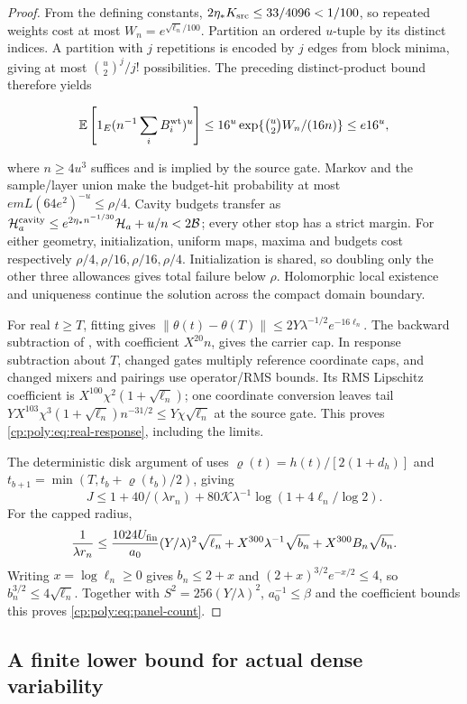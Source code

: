 \begin{proof}
From the defining constants,
$2\eta_*K_{\rm src}\le33/4096<1/100$, so repeated weights cost at most
$W_n=e^{\sqrt{\ell_n}/100}$. Partition an ordered $u$-tuple by its
distinct indices. A partition with $j$ repetitions is encoded by $j$
edges from block minima, giving at most $\binom u2^j/j!$ possibilities.
The preceding distinct-product bound therefore yields

\[
\mathbb E\left[1_E(n^{-1}\sum_iB_i^{\rm wt})^u\right]
 \le16^u\exp\{\tbinom u2W_n/(16n)\}\le e16^u,
\]

where $n\ge4u^3$ suffices and is implied by the source gate.
Markov and the sample/layer union make the budget-hit probability at most
$emL(64e^2)^{-u}\le\rho/4$.
Cavity budgets transfer as
$\mathcal H_a^{\rm cavity}\le
e^{2\eta_*n^{-1/30}}\mathcal H_a+u/n<2\mathcal B$;
every other stop has a strict margin.
For either geometry, initialization, uniform maps, maxima and budgets
cost respectively $\rho/4,\rho/16,\rho/16,\rho/4$.
Initialization is shared, so doubling only the other three allowances
gives total failure below $\rho$. Holomorphic local existence and
uniqueness continue the solution across the compact domain boundary.

For real $t\ge T$, fitting gives
$\|\theta(t)-\theta(T)\|\le2Y\lambda^{-1/2}e^{-16\ell_n}$.
The backward subtraction of , with coefficient
$X^{20}n$, gives the carrier cap. In response subtraction about $T$,
changed gates multiply reference coordinate caps, and changed mixers
and pairings use operator/RMS bounds. Its RMS Lipschitz coefficient is
$X^{100}\chi^2(1+\sqrt{\ell_n})$; one coordinate conversion leaves tail
$YX^{103}\chi^3(1+\sqrt{\ell_n})n^{-31/2}
\le Y\chi\sqrt{\ell_n}$ at the source gate.
This proves \eqref{cp:poly:eq:real-response}, including the limits.

The deterministic disk argument of 
uses $\varrho(t)=h(t)/[2(1+d_h)]$ and
$t_{b+1}=\min(T,t_b+\varrho(t_b)/2)$, giving
\[
J\le1+40/(\lambda r_n)
 +80\mathcal K\lambda^{-1}\log(1+4\ell_n/\log2).
\]
For the capped radius,
\[
\frac1{\lambda r_n}\le
\frac{1024U_{\rm fin}}{a_0}(Y/\lambda)^2\sqrt{\ell_n}
 +X^{300}\lambda^{-1}\sqrt{b_n}+X^{300}B_n\sqrt{b_n}.
\]
Writing $x=\log\ell_n\ge0$ gives $b_n\le2+x$ and
$(2+x)^{3/2}e^{-x/2}\le4$, so $b_n^{3/2}\le4\sqrt{\ell_n}$.
Together with $S^2=256(Y/\lambda)^2$, $a_0^{-1}\le\beta$
and the coefficient bounds this proves \eqref{cp:poly:eq:panel-count}.
\end{proof}

\subsection{A finite lower bound for actual dense variability}
\label{cp:poly:dense-lower-section}

